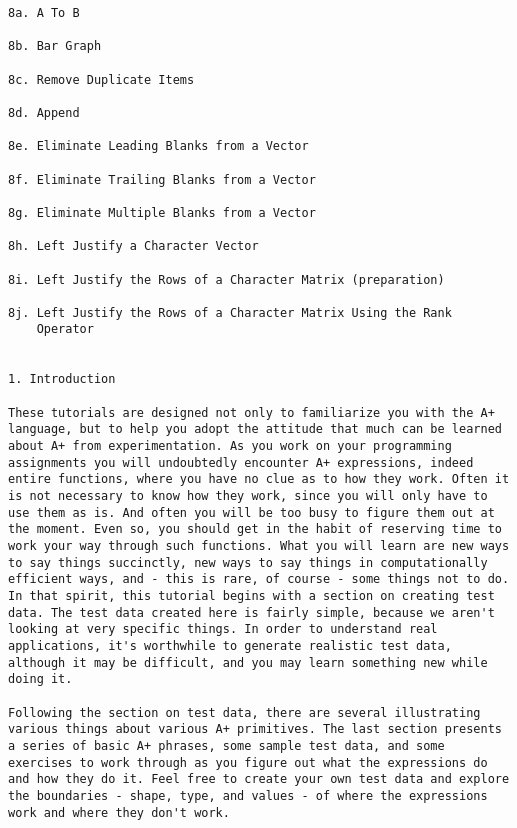 \documentclass{article}
\begin{document}
\begin{verbatim}
8a. A To B                                                            

8b. Bar Graph                                                         

8c. Remove Duplicate Items                                            

8d. Append                                                            

8e. Eliminate Leading Blanks from a Vector                            

8f. Eliminate Trailing Blanks from a Vector                           

8g. Eliminate Multiple Blanks from a Vector                           

8h. Left Justify a Character Vector                                   

8i. Left Justify the Rows of a Character Matrix (preparation)         

8j. Left Justify the Rows of a Character Matrix Using the Rank        
    Operator                                                              


1. Introduction                                                       

These tutorials are designed not only to familiarize you with the A+  
language, but to help you adopt the attitude that much can be learned 
about A+ from experimentation. As you work on your programming        
assignments you will undoubtedly encounter A+ expressions, indeed     
entire functions, where you have no clue as to how they work. Often it
is not necessary to know how they work, since you will only have to   
use them as is. And often you will be too busy to figure them out at  
the moment. Even so, you should get in the habit of reserving time to 
work your way through such functions. What you will learn are new ways
to say things succinctly, new ways to say things in computationally   
efficient ways, and - this is rare, of course - some things not to do.
In that spirit, this tutorial begins with a section on creating test  
data. The test data created here is fairly simple, because we aren't  
looking at very specific things. In order to understand real          
applications, it's worthwhile to generate realistic test data,        
although it may be difficult, and you may learn something new while   
doing it.                                                             

Following the section on test data, there are several illustrating    
various things about various A+ primitives. The last section presents 
a series of basic A+ phrases, some sample test data, and some         
exercises to work through as you figure out what the expressions do   
and how they do it. Feel free to create your own test data and explore
the boundaries - shape, type, and values - of where the expressions   
work and where they don't work.                                       


\end{verbatim}
\end{document}
